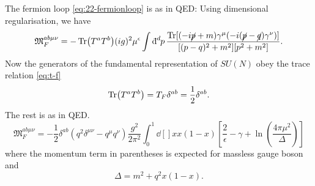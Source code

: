 The fermion loop \eqref{eq:22-fermionloop} is as in QED: Using dimensional regularisation, we have
\begin{equation}
  \mathfrak{M}_F^{ab \mu \nu} = - \Tr(T^{a} T^{b}) (ig)^2 \mu^{\epsilon} \int \bdd[d]{p} \frac{\Tr[(-i \cancel{p} + m) \gamma^{\mu} (-i (\cancel{p} - \cancel{q}) \gamma^\nu)]}{[(p - q)^2 + m^2][p^2 + m^2]}.
\end{equation}
Now the generators of the fundamental representation of $SU(N)$ obey the trace relation \eqref{eq:t-f}
\begin{equation}
  \Tr(T^{a} T^{b}) = T_F \delta^{ab} = \frac{1}{2} \delta^{ab}.
\end{equation}
The rest is as in QED.
\begin{equation}
  \mathfrak{M}_{F}^{ab \mu \nu} = -\frac{1}{2} \delta^{ab} \left( q^2 \delta^{\mu\nu} - q^{\mu} q^{\nu} \right) \frac{g^2}{2 \pi^2} \int_0^1 \dd[]{x} x(1 - x) \left[ \frac{2}{\epsilon} - \gamma + \ln( \frac{4 \pi \mu^2}{\Delta}) \right]
\end{equation}
where the momentum term in parentheses is expected for massless gauge boson and
\begin{equation}
  \Delta = m^2 + q^2 x(1 - x).
\end{equation}
